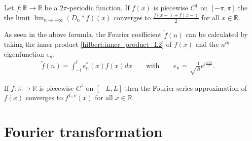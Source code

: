     \begin{property}
    	Let $f:\mathbb{R}\rightarrow\mathbb{R}$ be a $2\pi$-periodic function. If $f(x)$ is piecewise $C^1$ on $[-\pi, \pi]$ the the limit $\lim_{n\rightarrow+\infty}(D_n\ast f)(x)$ converges to $\frac{f(x+) + f(x-)}{2}$ for all $x\in\mathbb{R}$.
    \end{property}


    \begin{formula}
		As seen in the above formula, the Fourier coefficient $\widetilde{f}(n)$ can be calculated by taking the inner product \ref{hilbert:inner_product_L2} of $f(x)$ and the $n^{th}$ eigenfunction $e_n$:
		\begin{gather}
			\label{transforms:fourier_coefficients}
        		\widetilde{f}(n) = \int_{-l}^le_n^*(x)f(x)dx \qquad\text{with}\qquad e_n = \sqrt\frac{1}{2l}e^{i\frac{n\pi x}{l}}.
		\end{gather}
	\end{formula}

    \begin{property}
    	If $f:\mathbb{R}\rightarrow\mathbb{R}$ is piecewise $C^1$ on $[-L, L]$ then the Fourier series approximation of $f(x)$ converges to $f^{L, \nu}(x)$ for all $x\in\mathbb{R}$.
    \end{property}

\section{Fourier transformation}

